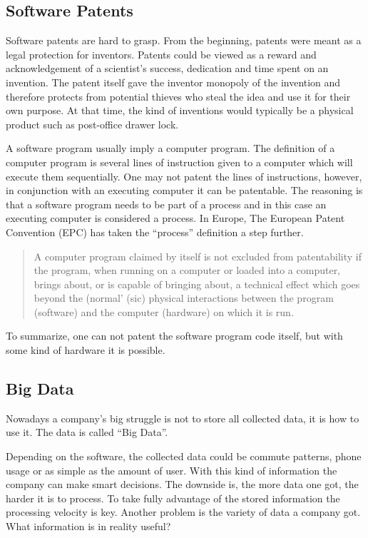 \documentclass[conference]{IEEEtran}
\begin{document}
\subsection{Software Patents}
Software patents are hard to grasp. From the beginning, patents were meant as a legal protection for inventors. Patents could be viewed as a reward and acknowledgement of a scientist's success, dedication and time spent on an invention. The patent itself gave the inventor monopoly of the invention and therefore protects from potential thieves who steal the idea and use it for their own purpose. \cite{SoftwarePatent} At that time, the kind of inventions would typically be a physical product such as post-office drawer lock.\cite{LockPatent}

A software program usually imply a computer program. The definition of a computer program is several lines of instruction given to a computer which will execute them sequentially. One may not patent the lines of instructions, however, in conjunction with an executing computer it can be patentable. The reasoning is that a software program needs to be part of a process and in this case an executing computer is considered a process. In Europe, The European Patent Convention (EPC) has taken the ``process'' definition a step further. \cite{SoftwarePatent}
\begin{quotation}
A computer program claimed by itself is not excluded from patentability if the program, when running on a computer or loaded into a computer, brings about, or is capable of bringing about, a technical effect which goes beyond the (normal' (sic) physical interactions between the program (software) and the computer (hardware) on which it is run. \cite[p. 36]{SoftwarePatent}
\end{quotation} 

To summarize, one can not patent the software program code itself, but with some kind of hardware it is possible.
\subsection{Big Data}
Nowadays a company's big struggle is not to store all collected data, it is how to use it. The data is called ``Big Data''. \cite{ExploitBigData}

Depending on the software, the collected data could be commute patterns, phone usage or as simple as the amount of user. With this kind of information the company can make smart decisions. The downside is, the more data one got, the harder it is to process. To take fully advantage of the stored information the processing velocity is key. Another problem is the variety of data a company got. What information is in reality useful? \cite{SpeedDataEco} %
\end{document}
